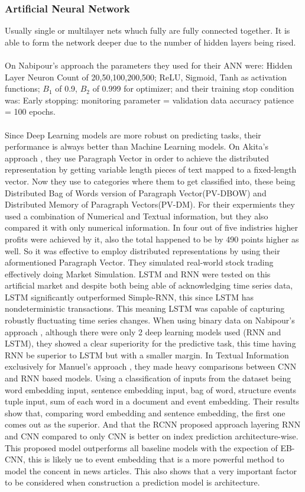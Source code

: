 \documentclass[conference]{IEEEtran}
\begin{document}
\subsubsection{Artificial Neural Network}
Usually single or multilayer nets whuch fully are fully connected together. It is able to form the network deeper due to the number of hidden layers being rised.
\\\\
On Nabipour's approach \cite{nabipour2020predicting} the parameters they used for their ANN were: Hidden Layer Neuron Count of 20,50,100,200,500; ReLU, Sigmoid, Tanh as activation functions; $B_1$ of 0.9, $B_2$ of 0.999 for optimizer; and their training stop condition
was: Early stopping: monitoring parameter = validation data accuracy patience = 100 epochs.
\\\\
Since Deep Learning models are more robust on predicting tasks, their performance is always better than Machine Learning models.
On Akita's approach \cite{Akita2016}, they use Paragraph Vector in order to achieve the distributed representation by getting variable length pieces of text mapped to a fixed-length vector.
Now they use to categories where them to get classified into, these being Distributed Bag of Words version of Paragraph Vector(PV-DBOW) and Distributed Memory of Paragraph Vectors(PV-DM). For their expermients they used a combination of Numerical and Textual
information, but they also compared it with only numerical information. In four out of five indistries higher profits were achieved by it, also the total happened to be by 490 points higher as well. So it was effective to employ distributed representations
by using their aformentioned Paragraph Vector. They simulated real-world stock trading effectively doing Market Simulation. LSTM and RNN were tested on this artificial market and despite both being able of acknowledging time series data, LSTM
significantly outperformed Simple-RNN, this since LSTM has nondeterministic transactions. This meaning LSTM was capable of capturing robustly fluctuating time series changes.
When using binary data on Nabipour's approach \cite{nabipour2020predicting}, although there were only 2 deep learning models used (RNN and LSTM), they showed a clear superiority for the predictive task, this time having RNN be superior to LSTM but with a smaller margin.
In Textual Information exclusively for Manuel's approach \cite{Vargas2017}, they made heavy comparisons between CNN and RNN based models. Using a classification of inputs from the dataset being word embedding input, sentence embedding input, bag of word, structure events tuple input, sum of each word in a document and event embedding.
Their results show that, comparing word embedding and sentence embedding, the first one comes out as the superior. And that the RCNN proposed approach layering RNN and CNN compared to only CNN is better on index prediction architecture-wise. This proposed model outperforms all baseline models with the expection of EB-CNN, this is likely ue to event embedding that is a more powerful method
to model the concent in news articles. This also shows that a very important factor to be considered when construction a prediction model is architecture.
\end{document}
